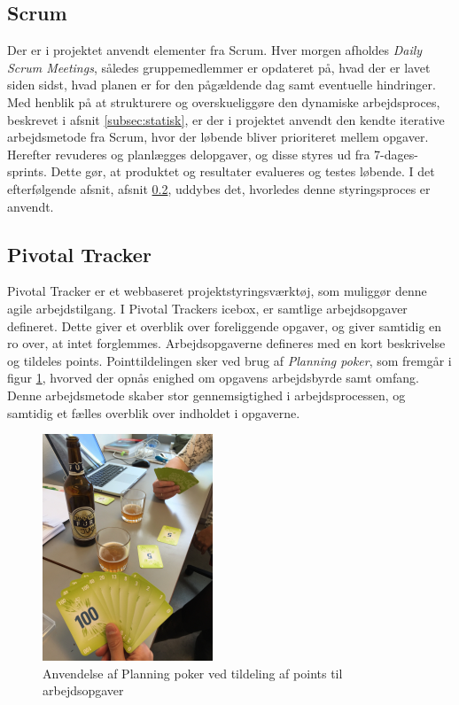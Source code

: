 	\subsection{Scrum}
	\label{subsec:scrum}
	Der er i projektet anvendt elementer fra Scrum. Hver morgen afholdes \textit{Daily Scrum Meetings}, således gruppemedlemmer er opdateret på, hvad der er lavet siden sidst, hvad planen er for den pågældende dag samt eventuelle hindringer. Med henblik på at strukturere og overskueliggøre den dynamiske arbejdsproces, beskrevet i afsnit \ref{subsec:statisk}, er der i projektet anvendt den kendte iterative arbejdsmetode fra Scrum, hvor der løbende bliver prioriteret mellem opgaver. Herefter revuderes og planlægges delopgaver, og disse styres ud fra 7-dages-sprints. Dette gør, at produktet og resultater evalueres og testes løbende. I det efterfølgende afsnit, afsnit \ref{subsec:pivotal}, uddybes det, hvorledes denne styringsproces er anvendt.  
	
	\subsection{Pivotal Tracker}
	\label{subsec:pivotal}
	Pivotal Tracker er et webbaseret projektstyringsværktøj, som muliggør denne agile arbejdstilgang. I Pivotal Trackers icebox, er samtlige arbejdsopgaver defineret. Dette giver et overblik over foreliggende opgaver, og giver samtidig en ro over, at intet forglemmes. Arbejdsopgaverne defineres med en kort beskrivelse og tildeles points. Pointtildelingen sker ved brug af \textit{Planning poker}, som fremgår i figur \ref{fig:planningpoker}, hvorved der opnås enighed om opgavens arbejdsbyrde samt omfang. Denne arbejdsmetode skaber stor gennemsigtighed i arbejdsprocessen, og samtidig et fælles overblik over indholdet i opgaverne. 
	
	\begin{figure}[htb]
	\centering
	\includegraphics[width=2in]{Planningpoker}
	\caption{Anvendelse af Planning poker ved tildeling af points til arbejdsopgaver}
	\label{fig:planningpoker}	
	\end{figure}
	 
